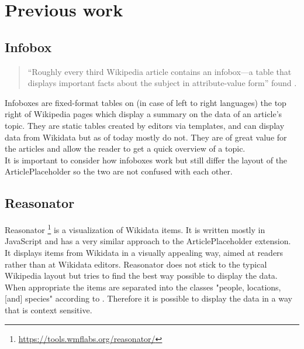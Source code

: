 \chapter{Previous work}
\section{Infobox} \label{infobox}
\begin{quote}
	``Roughly every third Wikipedia article contains an infobox---a table that displays important facts about the subject in attribute-value form'' found \citet[5]{infobox}.
\end{quote}
Infoboxes are fixed-format tables on (in case of left to right languages) the top right of Wikipedia pages which display a summary on the data of an article's topic. \citep{wiki:05} They are static tables created by editors via templates, and can display data from Wikidata but as of today mostly do not. They are of great value for the articles and allow the reader to get a quick overview of a topic. \\
It is important to consider how infoboxes work but still differ the layout of the ArticlePlaceholder so the two are not confused with each other.

\section{Reasonator}
Reasonator \footnote{\url{https://tools.wmflabs.org/reasonator/}} is a visualization of Wikidata items. It is written mostly in JavaScript and has a very similar approach to the ArticlePlaceholder extension. It displays items from Wikidata in a visually appealing way, aimed at readers rather than at Wikidata editors. Reasonator does not stick to the typical Wikipedia layout but tries to find the best way possible to display the data. \\
When appropriate the items are separated into the classes  "people, locations, [and] species" according to \citet{wiki:06}. Therefore it is possible to display the data in a way that is context sensitive. \\

